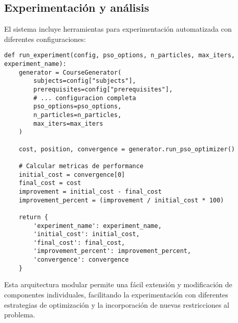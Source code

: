 \subsection{Experimentación y análisis}

El sistema incluye herramientas para experimentación automatizada con diferentes configuraciones:

\begin{verbatim}
def run_experiment(config, pso_options, n_particles, max_iters, experiment_name):
    generator = CourseGenerator(
        subjects=config["subjects"],
        prerequisites=config["prerequisites"],
        # ... configuracion completa
        pso_options=pso_options,
        n_particles=n_particles,
        max_iters=max_iters
    )
    
    cost, position, convergence = generator.run_pso_optimizer()
    
    # Calcular metricas de performance
    initial_cost = convergence[0]
    final_cost = cost
    improvement = initial_cost - final_cost
    improvement_percent = (improvement / initial_cost * 100)
    
    return {
        'experiment_name': experiment_name,
        'initial_cost': initial_cost,
        'final_cost': final_cost,
        'improvement_percent': improvement_percent,
        'convergence': convergence
    }
\end{verbatim}

Esta arquitectura modular permite una fácil extensión y modificación de componentes individuales, facilitando la experimentación con diferentes estrategias de optimización y la incorporación de nuevas restricciones al problema.